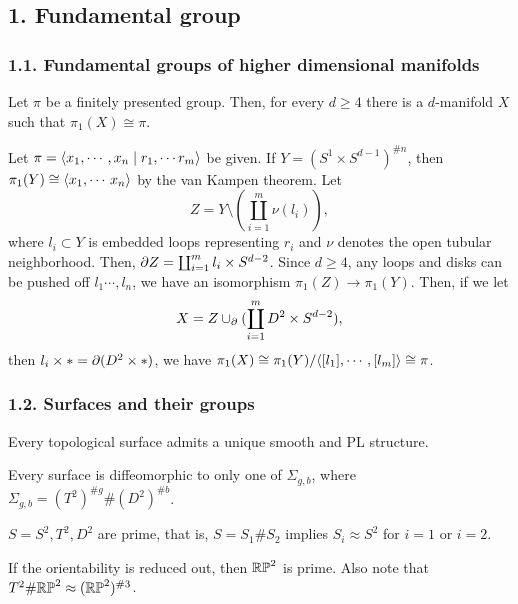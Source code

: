 \documentclass{../../small}
\begin{document}
\subsection*{1. Fundamental group}
\subsubsection*{1.1. Fundamental groups of higher dimensional manifolds}
\begin{prop}
Let $\pi$ be a finitely presented group.
Then, for every $d\ge4$ there is a $d$-manifold $X$ such that $\pi_1(X)\cong\pi$.
\end{prop}
\begin{pf}
Let $\pi=\langle x_1,\cdots,x_n\mid r_1,\cdots r_m\rangle$ be given.
If $Y=(S^1\times S^{d-1})^{\#n}$, then $\pi_1(Y)\cong\langle x_1,\cdots\,x_n\rangle$ by the van Kampen theorem.
Let
\[Z=Y\setminus(\coprod_{i=1}^m\nu(l_i)),\]
where $l_i\subset Y$ is embedded loops representing $r_i$ and $\nu$ denotes the open tubular neighborhood.
Then, $\pd Z=\coprod_{i=1}^ml_i\times S^{d-2}$.
Since $d\ge4$, any loops and disks can be pushed off $l_1\cdots,l_n$, we have an isomorphism $\pi_1(Z)\to\pi_1(Y)$.
Then, if we let
\[X=Z\cup_{\pd}(\coprod_{i=1}^mD^2\times S^{d-2}),\] then $l_i\times*=\pd(D^2\times*)$, we have $\pi_1(X)\cong\pi_1(Y)/\langle[l_1],\cdots,[l_m]\rangle\cong\pi$.
\end{pf}

\subsubsection*{1.2. Surfaces and their groups}

\begin{thm}
Every topological surface admits a unique smooth and PL structure.
\end{thm}

\begin{thm}
Every surface is diffeomorphic to only one of $\Sigma_{g,b}$, where $\Sigma_{g,b}=(T^2)^{\#g}\#(D^2)^{\#b}$.
\end{thm}

\begin{cor}
$S=S^2,T^2,D^2$ are prime, that is, $S=S_1\#S_2$ implies $S_i\approx S^2$ for $i=1$ or $i=2$.
\end{cor}

\begin{rmk}
If the orientability is reduced out, then $\mathbb{RP}^2$ is prime.
Also note that $T^2\#\mathbb{RP}^2\approx(\mathbb{RP}^2)^{\#3}$.
\end{rmk}
\end{document}
